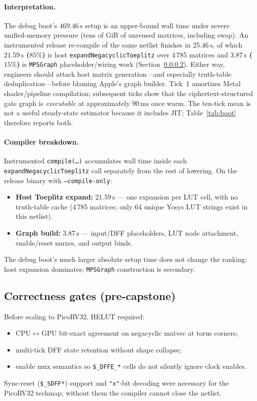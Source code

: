 \documentclass[11pt,a4paper]{article}
\begin{document}
\paragraph{Interpretation.}
The debug boot's $469.46\,\mathrm{s}$ setup is an upper-bound wall time under
severe unified-memory pressure (tens of GiB of unreused matrices, including
swap).
An instrumented release re-compile of the same netlist finishes in
$25.46\,\mathrm{s}$, of which \textbf{$21.59\,\mathrm{s}$ ($85\%$)} is host
\texttt{expandNegacyclicToeplitz} over 4\,785 matrices and
\textbf{$3.87\,\mathrm{s}$ ($15\%$)} is \texttt{MPSGraph} placeholder/wiring
work (Section~\ref{sec:compile-breakdown}).
Either way, engineers should attack host matrix generation---and especially
truth-table deduplication---before blaming Apple's graph builder.
Tick~1 amortizes Metal shader/pipeline compilation; subsequent ticks show that
the ciphertext-structured gate graph is \emph{executable} at
approximately $90\,\mathrm{ms}$ once warm.
The ten-tick mean is not a useful steady-state estimator because it includes
JIT; Table~\ref{tab:boot} therefore reports both.

\paragraph{Compiler breakdown.}
\label{sec:compile-breakdown}
Instrumented \texttt{compile(\ldots)} accumulates wall time inside each
\texttt{expandNegacyclicToeplitz} call separately from the rest of lowering.
On the release binary with \texttt{--compile-only}:
\begin{itemize}[leftmargin=*,itemsep=1pt]
  \item \textbf{Host Toeplitz expand:} $21.59\,\mathrm{s}$ --- one expansion per
        LUT cell, with no truth-table cache (4\,785 matrices;
        only 64 unique Yosys LUT strings exist in this netlist).
  \item \textbf{Graph build:} $3.87\,\mathrm{s}$ --- input/DFF placeholders, LUT
        node attachment, enable/reset muxes, and output binds.
\end{itemize}
The debug boot's much larger absolute setup time does not change the ranking:
host expansion dominates; \texttt{MPSGraph} construction is secondary.

\subsection{Correctness gates (pre-capstone)}

Before scaling to PicoRV32, HELUT required:
\begin{itemize}[leftmargin=*,itemsep=1pt]
  \item CPU$\leftrightarrow$GPU bit-exact agreement on negacyclic matvec at torus
        corners;
  \item multi-tick DFF state retention without shape collapse;
  \item enable mux semantics so \texttt{\$\_DFFE\_*} cells do not silently ignore
        clock enables.
\end{itemize}
Sync-reset (\texttt{\$\_SDFF*}) support and \texttt{"x"}-bit decoding were
necessary for the PicoRV32 techmap; without them the compiler cannot close the
netlist.
\end{document}
